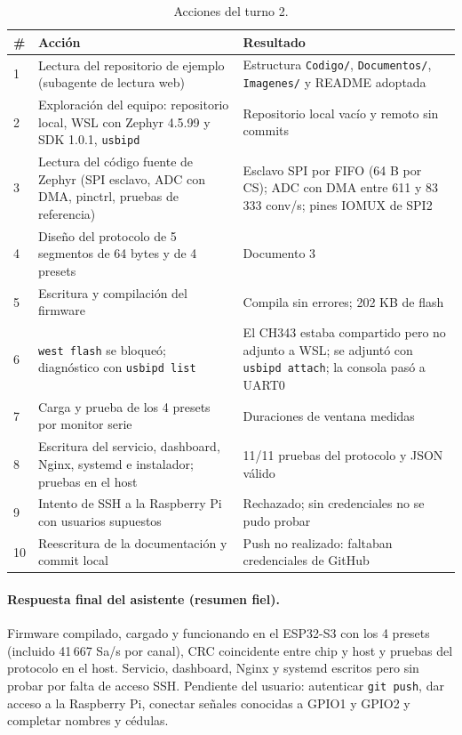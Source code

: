 \documentclass[12pt,a4paper]{article}
\begin{document}
\begin{table}[H]
\centering
\small
\begin{tabular}{@{}p{0.6cm} p{7.2cm} p{7.2cm}@{}}
\toprule
\textbf{\#} & \textbf{Acción} & \textbf{Resultado} \\
\midrule
1 & Lectura del repositorio de ejemplo (subagente de lectura web) & Estructura \texttt{Codigo/}, \texttt{Documentos/}, \texttt{Imagenes/} y README adoptada \\
2 & Exploración del equipo: repositorio local, WSL con Zephyr 4.5.99 y SDK 1.0.1, \texttt{usbipd} & Repositorio local vacío y remoto sin commits \\
3 & Lectura del código fuente de Zephyr (SPI esclavo, ADC con DMA, pinctrl, pruebas de referencia) & Esclavo SPI por FIFO (64 B por CS); ADC con DMA entre 611 y 83\,333 conv/s; pines IOMUX de SPI2 \\
4 & Diseño del protocolo de 5 segmentos de 64 bytes y de 4 presets & Documento 3 \\
5 & Escritura y compilación del firmware & Compila sin errores; 202 KB de flash \\
6 & \texttt{west flash} se bloqueó; diagnóstico con \texttt{usbipd list} & El CH343 estaba compartido pero no adjunto a WSL; se adjuntó con \texttt{usbipd attach}; la consola pasó a UART0 \\
7 & Carga y prueba de los 4 presets por monitor serie & Duraciones de ventana medidas \\
8 & Escritura del servicio, dashboard, Nginx, systemd e instalador; pruebas en el host & 11/11 pruebas del protocolo y JSON válido \\
9 & Intento de SSH a la Raspberry Pi con usuarios supuestos & Rechazado; sin credenciales no se pudo probar \\
10 & Reescritura de la documentación y commit local & Push no realizado: faltaban credenciales de GitHub \\
\bottomrule
\end{tabular}
\caption{Acciones del turno 2.}
\end{table}

\paragraph{Respuesta final del asistente (resumen fiel).} Firmware compilado, cargado y funcionando en el ESP32-S3 con los 4 presets (incluido 41\,667 Sa/s por canal), CRC coincidente entre chip y host y pruebas del protocolo en el host. Servicio, dashboard, Nginx y systemd escritos pero sin probar por falta de acceso SSH. Pendiente del usuario: autenticar \texttt{git push}, dar acceso a la Raspberry Pi, conectar señales conocidas a GPIO1 y GPIO2 y completar nombres y cédulas.
\end{document}
